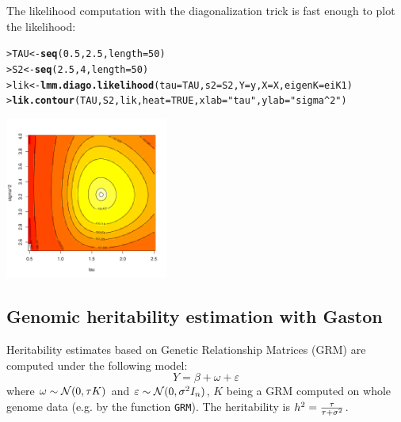 \documentclass{article}\usepackage[]{graphicx}\usepackage[]{color}
\makeatletter
\newcommand{\hlnum}[1]{\textcolor[rgb]{0.686,0.059,0.569}{#1}}%
\newcommand{\hlstr}[1]{\textcolor[rgb]{0.192,0.494,0.8}{#1}}%
\newcommand{\hlstd}[1]{\textcolor[rgb]{0.345,0.345,0.345}{#1}}%
\newcommand{\hlkwb}[1]{\textcolor[rgb]{0.69,0.353,0.396}{#1}}%
\newcommand{\hlkwc}[1]{\textcolor[rgb]{0.333,0.667,0.333}{#1}}%
\newcommand{\hlkwd}[1]{\textcolor[rgb]{0.737,0.353,0.396}{\textbf{#1}}}%
\newenvironment{kframe}{%
 \def\at@end@of@kframe{}%
 \ifinner\ifhmode%
  \def\at@end@of@kframe{\end{minipage}}%
  \begin{minipage}{\columnwidth}%
 \fi\fi%
 \def\FrameCommand##1{\hskip\@totalleftmargin \hskip-\fboxsep
 \colorbox{shadecolor}{##1}\hskip-\fboxsep
     \hskip-\linewidth \hskip-\@totalleftmargin \hskip\columnwidth}%
 \MakeFramed {\advance\hsize-\width
   \@totalleftmargin\z@ \linewidth\hsize
   \@setminipage}}%
 {\par\unskip\endMakeFramed%
 \at@end@of@kframe}
\newenvironment{knitrout}{}{} %
\let\epsilon\varepsilon
\makeatother
\begin{document}
  The likelihood computation with the diagonalization trick is fast enough to 
  plot the likelihood:

\begin{knitrout}
\color{fgcolor}\begin{kframe}
\begin{alltt}
\hlstd{> }\hlstd{TAU} \hlkwb{<-} \hlkwd{seq}\hlstd{(}\hlnum{0.5}\hlstd{,}\hlnum{2.5}\hlstd{,}\hlkwc{length}\hlstd{=}\hlnum{50}\hlstd{)}
\hlstd{> }\hlstd{S2} \hlkwb{<-} \hlkwd{seq}\hlstd{(}\hlnum{2.5}\hlstd{,}\hlnum{4}\hlstd{,}\hlkwc{length}\hlstd{=}\hlnum{50}\hlstd{)}
\hlstd{> }\hlstd{lik} \hlkwb{<-} \hlkwd{lmm.diago.likelihood}\hlstd{(}\hlkwc{tau} \hlstd{= TAU,} \hlkwc{s2} \hlstd{= S2,} \hlkwc{Y} \hlstd{= y,} \hlkwc{X} \hlstd{= X,} \hlkwc{eigenK} \hlstd{= eiK1)}
\hlstd{> }\hlkwd{lik.contour}\hlstd{(TAU, S2, lik,} \hlkwc{heat} \hlstd{=} \hlnum{TRUE}\hlstd{,} \hlkwc{xlab} \hlstd{=} \hlstr{"tau"}\hlstd{,} \hlkwc{ylab} \hlstd{=} \hlstr{"sigma^2"}\hlstd{)}
\end{alltt}
\end{kframe}

{\centering \includegraphics[width=0.4\textwidth]{figure/unnamed-chunk-44-1} 

}



\end{knitrout}



\subsection{Genomic heritability estimation with Gaston}

  Heritability estimates based on Genetic Relationship Matrices (GRM)
  are computed under the following model:
  \begin{equation*}
  Y = \beta + \omega + \epsilon
  \end{equation*}
  where $\omega \sim \mathcal{N}(0, \tau K)$ and $\epsilon\sim \N(0, \sigma^2 I_n)$,
  $K$ being a GRM computed on whole genome data (e.g. by the function \verb!GRM!).
  The heritability is $h^2 = {\tau \over \tau + \sigma^2}$.
\end{document}
